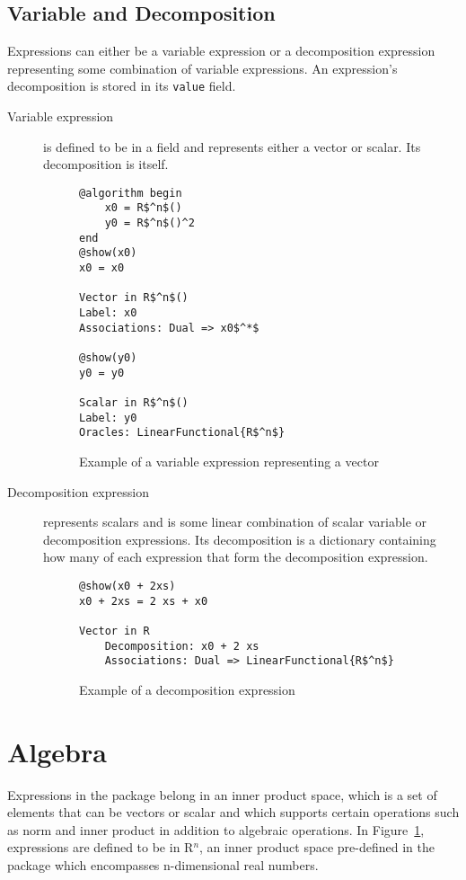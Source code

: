 \subsection*{Variable and Decomposition}
Expressions can either be a variable expression or a decomposition expression representing some combination of variable expressions. An expression's decomposition is stored in its \texttt{value} field.
\begin{description}
	\item[Variable expression] is defined to be in a field and represents either a vector or scalar. Its decomposition is itself.
\begin{figure}[h]
		\begin{lstlisting}[mathescape]
@algorithm begin
	x0 = R$^n$()
	y0 = R$^n$()^2
end
@show(x0)
x0 = x0

Vector in R$^n$()
Label: x0
Associations: Dual => x0$^*$

@show(y0)
y0 = y0

Scalar in R$^n$()
Label: y0
Oracles: LinearFunctional{R$^n$}
		\end{lstlisting}
	
	\caption{Example of a variable expression representing a vector}
	\label{ex_variable}
\end{figure}
	\item[Decomposition expression] represents scalars and is some linear combination of scalar variable or decomposition expressions. Its decomposition is a dictionary containing how many of each expression that form the decomposition expression.

\begin{figure}[h]
		\begin{lstlisting}[mathescape]
@show(x0 + 2xs)
x0 + 2xs = 2 xs + x0

Vector in R
	Decomposition: x0 + 2 xs
	Associations: Dual => LinearFunctional{R$^n$}
		\end{lstlisting}
	\caption{Example of a decomposition expression}
	\label{ex_decomposition}
\end{figure}
\end{description}

\section{Algebra}
Expressions in the package belong in an inner product space, which is a set of elements that can be vectors or scalar and which supports certain operations such as norm and inner product in addition to algebraic operations. In Figure~\ref{ex_variable}, expressions are defined to be in R$^n$, an inner product space pre-defined in the package which encompasses n-dimensional real numbers.

